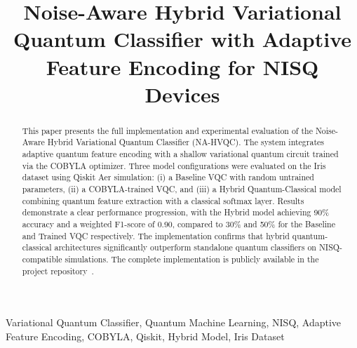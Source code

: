 \documentclass[conference]{IEEEtran}
\begin{document}
\title{Noise-Aware Hybrid Variational Quantum Classifier with Adaptive Feature Encoding for NISQ Devices}

\author{
  \and
  \and
}

\maketitle

\begin{abstract}
This paper presents the full implementation and experimental evaluation of the Noise-Aware Hybrid Variational Quantum Classifier (NA-HVQC). The system integrates adaptive quantum feature encoding with a shallow variational quantum circuit trained via the COBYLA optimizer. Three model configurations were evaluated on the Iris dataset using Qiskit Aer simulation: (i) a Baseline VQC with random untrained parameters, (ii) a COBYLA-trained VQC, and (iii) a Hybrid Quantum-Classical model combining quantum feature extraction with a classical softmax layer. Results demonstrate a clear performance progression, with the Hybrid model achieving 90\% accuracy and a weighted F1-score of 0.90, compared to 30\% and 50\% for the Baseline and Trained VQC respectively. The implementation confirms that hybrid quantum-classical architectures significantly outperform standalone quantum classifiers on NISQ-compatible simulations. The complete implementation is publicly available in the project repository~\cite{kabeer2025github}.
\end{abstract}

\begin{IEEEkeywords}
Variational Quantum Classifier, Quantum Machine Learning, NISQ, Adaptive Feature Encoding, COBYLA, Qiskit, Hybrid Model, Iris Dataset
\end{IEEEkeywords}
\end{document}
